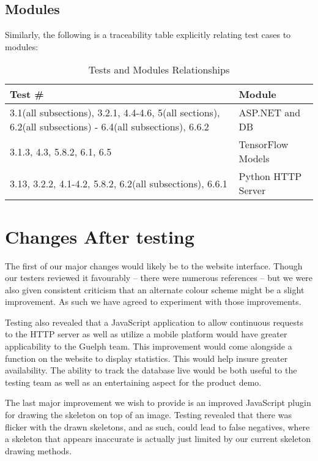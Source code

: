 \documentclass{scrreprt}
\begin{document}
\section{Modules}
Similarly, the following is a traceability table explicitly relating test cases to modules:\\
\begin{table}
\caption{Tests and Modules Relationships}
\begin{center}
\begin{tabular}{p{6cm} p{4cm}}
\hline
\textbf Test \#  & Module \\
\hline
3.1(all subsections), 3.2.1, 4.4-4.6, 5(all sections), 6.2(all subsections) - 6.4(all subsections), 6.6.2 & ASP.NET and DB \\
\hline
3.1.3, 4.3, 5.8.2, 6.1, 6.5 & TensorFlow Models \\
\hline
3.13, 3.2.2, 4.1-4.2, 5.8.2, 6.2(all subsections), 6.6.1 & Python HTTP Server\\
\hline
\end{tabular}
\end{center}
\end{table}

\chapter{Changes After testing}

The first of our major changes would likely be to the website interface. Though
our testers reviewed it favourably -- there were numerous references -- but we
were also given consistent criticism that an alternate colour scheme might be a
slight improvement. As such we have agreed to experiment with those
improvements.

Testing also revealed that a JavaScript application to allow continuous requests
to the HTTP server as well as utilize a mobile platform would have greater
applicability to the Guelph team. This improvement would come alongside a
function on the website to display statistics. This would help insure greater
availability. The ability to track the database live would be both useful to
the testing team as well as an entertaining aspect for the product demo.

The last major improvement we wish to provide is an improved JavaScript plugin
for drawing the skeleton on top of an image. Testing revealed that there was
flicker with the drawn skeletons, and as such, could lead to false negatives,
where a skeleton that appears inaccurate is actually just limited by our
current skeleton drawing methods.
\end{document}
